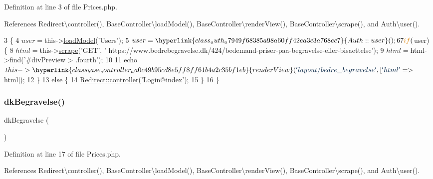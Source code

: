 Definition at line 3 of file Prices.\+php.



References Redirect\textbackslash{}controller(), Base\+Controller\textbackslash{}load\+Model(), Base\+Controller\textbackslash{}render\+View(), Base\+Controller\textbackslash{}scrape(), and Auth\textbackslash{}user().


\begin{DoxyCode}
3                                       \{
4         $user = $this->\hyperlink{class_base_controller_a5fa8890bd3a9d20f5c0cc2377dc49eb1}{loadModel}(\textcolor{stringliteral}{'Users'});
5         $user = \hyperlink{class_auth_a7949f68385a98a60ff42ea3c3a768ec7}{Auth::user}();
6 
7         \textcolor{keywordflow}{if} ($user) \{
8             $html = $this->\hyperlink{class_base_controller_abd4f25604b09a96c254491df97612cc3}{scrape}(\textcolor{stringliteral}{'GET'}, \textcolor{stringliteral}{'
      https://www.bedrebegravelse.dk/424/bedemand-priser-paa-begravelse-eller-bisaettelse'});
9             $html = $html->find(\textcolor{stringliteral}{'#divPreview > .fourth'});
10 
11             echo $this->\hyperlink{class_base_controller_aa0c49b95cd8e5ff8ff61b4a2c35bf1eb}{renderView}(\textcolor{stringliteral}{'layout/bedre\_begravelse'}, [\textcolor{stringliteral}{'html'} => $html]);
12         \}
13         \textcolor{keywordflow}{else} \{
14             \hyperlink{class_redirect_ab7d0d268b6aaa9a5470b7cb8c7eb1b61}{Redirect::controller}(\textcolor{stringliteral}{'Login@index'});
15         \}
16     \}
\end{DoxyCode}
\hypertarget{class_prices_a9b339ac1afc9f2234083aafe76d94a8e}{}\label{class_prices_a9b339ac1afc9f2234083aafe76d94a8e} 
\subsubsection{\texorpdfstring{dk\+Begravelse()}{dkBegravelse()}}
{\footnotesize\ttfamily dk\+Begravelse (\begin{DoxyParamCaption}{ }\end{DoxyParamCaption})}



Definition at line 17 of file Prices.\+php.



References Redirect\textbackslash{}controller(), Base\+Controller\textbackslash{}load\+Model(), Base\+Controller\textbackslash{}render\+View(), Base\+Controller\textbackslash{}scrape(), and Auth\textbackslash{}user().


